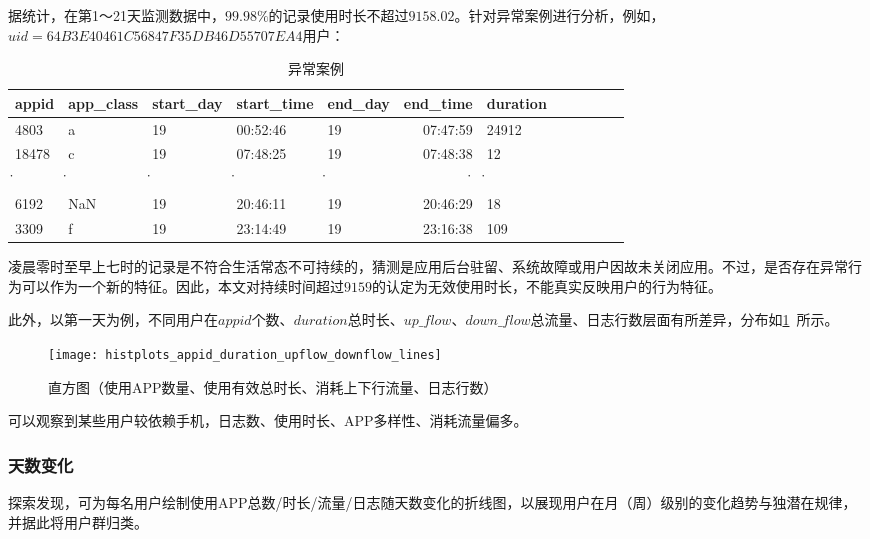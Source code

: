 \documentclass[withoutpreface,bwprint]{cumcmthesis}
\begin{document}
据统计，在第1～21天监测数据中，$99.98\%$的记录使用时长不超过$9158.02$。针对异常案例进行分析，例如，$uid=64B3E40461C56847F35DB46D55707EA4$用户：

\begin{table}[!htbp]
    \caption{异常案例}\label{tab:005} \centering
    \begin{tabular}{lllllrlrlrrr}
        \toprule[1.5pt]
        appid & app\_class & start\_day & start\_time & end\_day & end\_time & duration \\
        \midrule[1pt]
        4803  & a          & 19         & 00:52:46    & 19       & 07:47:59  & 24912    \\
        18478 & c          & 19         & 07:48:25    & 19       & 07:48:38  & 12       \\
        \.    & \.         & \.         & \.          & \.       & \.        & \.       \\
        6192  & NaN        & 19         & 20:46:11    & 19       & 20:46:29  & 18       \\
        3309  & f          & 19         & 23:14:49    & 19       & 23:16:38  & 109      \\
        \bottomrule[1.5pt]
    \end{tabular}
\end{table}

凌晨零时至早上七时的记录是不符合生活常态不可持续的，猜测是应用后台驻留、系统故障或用户因故未关闭应用。不过，是否存在异常行为可以作为一个新的特征。因此，本文对持续时间超过$9159$的认定为无效使用时长，不能真实反映用户的行为特征。

此外，以第一天为例，不同用户在$appid$个数、$duration$总时长、$up\_flow$、$down\_flow$总流量、日志行数层面有所差异，分布如\cref{fig:005}~所示。

\begin{figure}[!htbp]
    \centering
    \texttt{[image: histplots\_appid\_duration\_upflow\_downflow\_lines]}
    \caption{直方图（使用APP数量、使用有效总时长、消耗上下行流量、日志行数）}
    \label{fig:005}
\end{figure}

可以观察到某些用户较依赖手机，日志数、使用时长、APP多样性、消耗流量偏多。

\subsubsection{天数变化}

探索发现，可为每名用户绘制使用APP总数/时长/流量/日志随天数变化的折线图，以展现用户在月（周）级别的变化趋势与独潜在规律，并据此将用户群归类。
\end{document}
